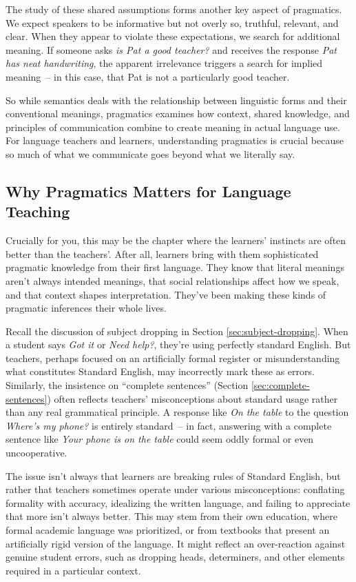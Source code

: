 The study of these shared assumptions forms another key aspect of pragmatics. We expect speakers to be informative but not overly so, truthful, relevant, and clear. When they appear to violate these expectations, we search for additional meaning. If someone asks \textit{is Pat a good teacher?} and receives the response \textit{Pat has neat handwriting}, the apparent irrelevance triggers a search for implied meaning~-- in this case, that Pat is not a particularly good teacher.

So while semantics deals with the relationship between linguistic forms and their conventional meanings, pragmatics examines how context, shared knowledge, and principles of communication combine to create meaning in actual language use. For language teachers and learners, understanding pragmatics is crucial because so much of what we communicate goes beyond what we literally say.

\subsection{Why Pragmatics Matters for Language Teaching}

Crucially for you, this may be the chapter where the learners' instincts are often better than the teachers'. After all, learners bring with them sophisticated pragmatic knowledge from their first language. They know that literal meanings aren't always intended meanings, that social relationships affect how we speak, and that context shapes interpretation. They've been making these kinds of pragmatic inferences their whole lives.

Recall the discussion of subject dropping in Section \ref{sec:subject-dropping}. When a student says \textit{Got it} or \textit{Need help?}, they're using perfectly standard English. But teachers, perhaps focused on an artificially formal register or misunderstanding what constitutes Standard English, may incorrectly mark these as errors. Similarly, the insistence on ``complete sentences'' (Section \ref{sec:complete-sentences}) often reflects teachers' misconceptions about standard usage rather than any real grammatical principle. A response like \textit{On the table} to the question \textit{Where's my phone?} is entirely standard~-- in fact, answering with a complete sentence like \textit{Your phone is on the table} could seem oddly formal or even uncooperative.

The issue isn't always that learners are breaking rules of Standard English, but rather that teachers sometimes operate under various misconceptions: conflating formality with accuracy, idealizing the written language, and failing to appreciate that more isn't always better. This may stem from their own education, where formal academic language was prioritized, or from textbooks that present an artificially rigid version of the language. It might reflect an over-reaction against genuine student errors, such as dropping heads, determiners, and other elements required in a particular context.

